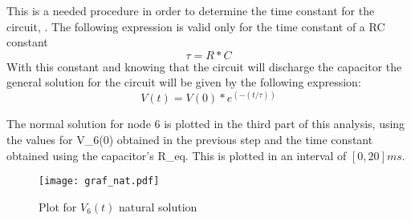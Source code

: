 \vspace{20pt}
This is a needed procedure in order to determine the time constant for the circuit, \tau. The following expression is valid only for the time constant of a RC constant
\begin{equation}
\tau=R*C
\end{equation}
 With this constant and knowing that the circuit will discharge the capacitor the general solution for the circuit will be given by the following expression:
\begin{equation}
V(t)=V(0)*e^(-(t/\tau))
\end{equation}


The normal solution for node 6 is plotted in the third part of this analysis, using the values for V_6(0) obtained in the previous step and the time constant obtained using the capacitor's R_{eq}. This is plotted in an interval of $[0, 20]ms$.
\begin{figure}[h] \centering
\texttt{[image: graf\_nat.pdf]}
\caption{Plot for $V_6(t)$ natural solution}
\end{figure}


